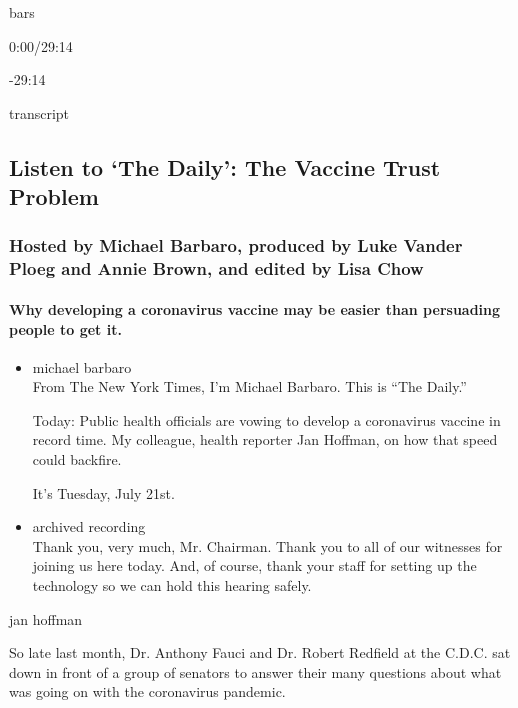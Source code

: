 bars

0:00/29:14

-29:14

transcript

\hypertarget{listen-to-the-daily-the-vaccine-trust-problem-1}{%
\subsection{Listen to `The Daily': The Vaccine Trust
Problem}\label{listen-to-the-daily-the-vaccine-trust-problem-1}}

\hypertarget{hosted-by-michael-barbaro-produced-by-luke-vander-ploeg-and-annie-brown-and-edited-by-lisa-chow}{%
\subsubsection{Hosted by Michael Barbaro, produced by Luke Vander Ploeg
and Annie Brown, and edited by Lisa
Chow}\label{hosted-by-michael-barbaro-produced-by-luke-vander-ploeg-and-annie-brown-and-edited-by-lisa-chow}}

\hypertarget{why-developing-a-coronavirus-vaccine-may-be-easier-than-persuading-people-to-get-it}{%
\paragraph{Why developing a coronavirus vaccine may be easier than
persuading people to get
it.}\label{why-developing-a-coronavirus-vaccine-may-be-easier-than-persuading-people-to-get-it}}

\begin{itemize}
\item
  michael barbaro\\
  From The New York Times, I'm Michael Barbaro. This is ``The Daily.''

  Today: Public health officials are vowing to develop a coronavirus
  vaccine in record time. My colleague, health reporter Jan Hoffman, on
  how that speed could backfire.

  It's Tuesday, July 21st.
\item
  archived recording\\
  Thank you, very much, Mr. Chairman. Thank you to all of our witnesses
  for joining us here today. And, of course, thank your staff for
  setting up the technology so we can hold this hearing safely.
\end{itemize}

jan hoffman

So late last month, Dr. Anthony Fauci and Dr. Robert Redfield at the
C.D.C. sat down in front of a group of senators to answer their many
questions about what was going on with the coronavirus pandemic.


